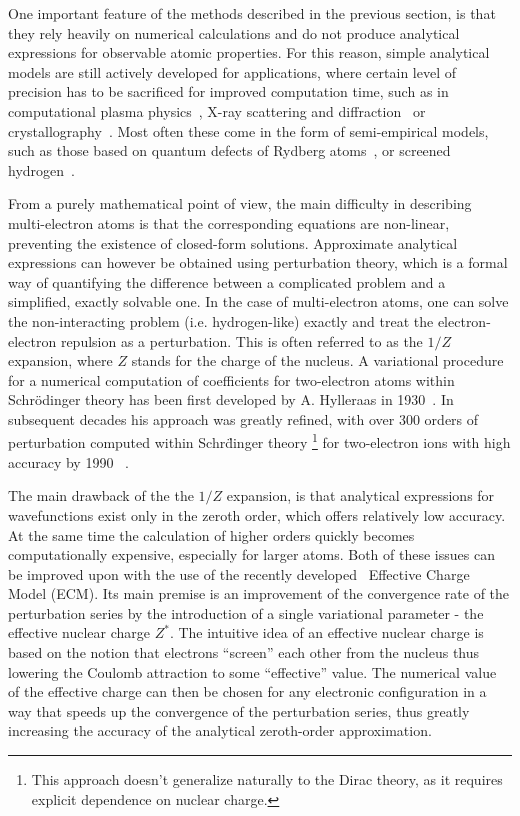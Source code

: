 One important feature of the methods described in the previous section, is that they rely heavily on numerical calculations and do not produce analytical expressions for observable atomic properties. For this reason, simple analytical models are still actively developed
\cite{TATEWAKI201849, gomez_simple_2019, SimpleHey} for applications, where certain
level of precision has to be sacrificed for improved computation time,
such as in computational plasma physics~\cite{lee_model_1987, chung_flychk:_2005}, X-ray scattering and diffraction~\cite{hau2012high, feranchuk_new_2002} or crystallography~\cite{toraya_new_2016}. Most often these come in the form of semi-empirical models, such as
those based on quantum defects of Rydberg atoms~\cite{foot2005atomic}, or screened hydrogen~\cite{hau2012high}.

From a purely mathematical point of view, the main difficulty in describing multi-electron atoms is that the corresponding equations are non-linear, preventing the existence of closed-form solutions. Approximate analytical expressions can however be obtained using perturbation theory, which is a formal way of quantifying the difference between a complicated problem and a simplified, exactly solvable one. In the case of multi-electron atoms, one can solve the non-interacting problem (i.e. hydrogen-like) exactly and treat the electron-electron repulsion as a perturbation. This is often referred to as the $1/Z$ expansion, where $Z$ stands for the charge of the nucleus. A variational procedure for a numerical computation of coefficients for two-electron atoms within Schr\"odinger theory has been first developed by A. Hylleraas in 1930~\cite{1930ZPhy6209H}. In subsequent decades his approach was greatly refined, with over 300 orders of perturbation computed within Schr\"dinger theory \footnote{This approach doesn't generalize naturally to the Dirac theory, as it requires explicit dependence on nuclear charge.} for two-electron ions with high accuracy by 1990~\cite{PhysRevA.41.1247} .

The main drawback of the the $1/Z$ expansion, is that analytical expressions for wavefunctions exist only in the zeroth order, which offers relatively low accuracy. At the same time the calculation of higher orders quickly becomes computationally expensive, especially for larger atoms. Both of these issues can be improved upon with the use of the recently developed~\cite{Skoromnik_2017} Effective Charge Model (ECM). Its main premise is an improvement of the convergence rate of the perturbation series by the introduction of a single variational parameter - the effective nuclear charge $Z^*$. The intuitive idea of an effective nuclear charge is based on the notion that
electrons ``screen'' each other from the nucleus thus lowering the
Coulomb attraction to some ``effective'' value. The numerical value of the effective charge can then be chosen for any electronic configuration in a way that speeds up the convergence of the perturbation series, thus greatly increasing the accuracy of the analytical zeroth-order approximation. 

